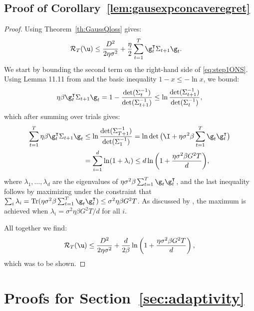 \documentclass{colt2018} %
\DeclareMathOperator{\Tr}{Tr}			%
\renewcommand{\top}{\intercal}
\newcommand{\regret}{\mathcal{R}}
\begin{document}
\subsection{Proof of Corollary~\ref{lem:gausexpconcaveregret}}\label{sec:ONSproof}
\begin{proof}
Using Theorem~\ref{th:GaussQloss} gives:
\begin{equation}\label{eq:step1ONS}
\begin{split}
    \regret_T(\u) & \leq \frac{D^2}{2\eta\sigma^2} + \frac{\eta}{2}\sum_{t=1}^T\g_t^\top\Sigma_{t+1}\g_t.
\end{split}    
\end{equation}
% 
We start by bounding the second term on the right-hand side of \eqref{eq:step1ONS}. Using Lemma 11.11 from \citet{CesaBianchiLugosi2006} 
and the basic inequality $1-x \leq -\ln x$, we bound:
\[
  \eta \beta \g_t^\top \Sigma_{t+1} \g_t
    = 1- \frac{\det(\Sigma_t^{-1})}{\det(\Sigma_{t+1}^{-1})} 
  \leq \ln\frac{\det(\Sigma_{t+1}^{-1})}{\det(\Sigma_{t}^{-1})}, 
\]
which after summing over trials gives:
% 
\begin{align*}
  \sum_{t=1}^T \eta \beta \g_t^\top \Sigma_{t+1} \g_t
  &\leq \ln\frac{\det(\Sigma_{T+1}^{-1})}{\det(\Sigma_{1}^{-1})}
  = \ln \det \big(\I + \eta \sigma^2 \beta \sum_{t=1}^T \g_t
  \g_t^\top\big)\\
  &= \sum_{i=1}^d \ln (1 + \lambda_i)
  \leq d \ln\bigg(1 + \frac{\eta\sigma^2 \beta G^2 T}{d}\bigg),
\end{align*}
% 
where $\lambda_1,\ldots,\lambda_d$ are the eigenvalues of $ \eta\sigma^2
\beta \sum_{t=1}^T \g_t \g_t^\top$, and the
last inequality follows by maximizing under the constraint that
$\sum_i \lambda_i = \Tr( \eta\sigma^2
\beta \sum_{t=1}^T \g_t \g_t^\top) \leq \sigma^2 \eta \beta G^2 T$. As
discussed by
\citet[proof and
discussion of Theorem~11.7]{CesaBianchiLugosi2006}, the maximum is
achieved when $\lambda_i = \sigma^2 \eta \beta G^2 T / d$ for all $i$.

All together we find:
\[
    \regret_T(\u) \leq \frac{D^2}{2\eta\sigma^2} +
        \frac{d}{2\beta}\ln\left(1 + \frac{\eta \sigma^2\beta G^2 T}{d} \right),
\]
% 
which was to be shown.

\end{proof}

\section{Proofs for Section~\ref{sec:adaptivity}}
\end{document}
